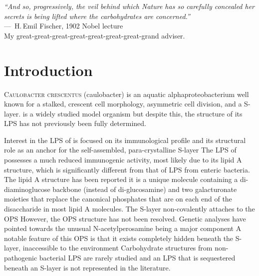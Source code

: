 \acresetall
{}

\begin{epigraph}
  \emph{``And so, progressively, the veil behind which Nature has so carefully concealed her secrets
    is being lifted where the carbohydrates are concerned.''} \\---~H.\,Emil Fischer, 1902 Nobel
  lecture\\ My great-great-great-great-great-great-great-grand adviser.
\end{epigraph}
\section{Introduction} %
\label{sec:lps_introduction} 
\lettrine[lines=2]{C}{aulobacter crescentus} (\acs{caulobacter}) is an aquatic alphaproteobacterium
well known for a stalked, crescent cell morphology, asymmetric cell division, and a
\ac{S-layer}. \caulobacter is a widely studied model organism but despite this, the structure of its \ac{LPS} has not previously been fully
determined.

Interest in the \ac{LPS} of \caulobacter is focused on its immunological
profile and its structural role as an anchor for the
self-assembled, para-crystalline \ac{S-layer} The \ac{LPS}
of \caulobacter possesses a much reduced immunogenic activity, most likely due
to its lipid A structure, which is significantly different from that of
\ac{LPS} from enteric bacteria. The lipid A structure has been
reported it is a unique molecule containing a
di-diaminoglucose backbone (instead of di-glucosamine) and two galacturonate
moieties that replace the canonical phosphates that are on each end of the
disaccharide in most lipid A molecules. The \caulobacter \ac{S-layer}
non-covalently attaches to the \ac{OPS} However, the
\ac{OPS} structure has not been resolved. Genetic analyses have pointed
towards the unusual N-acetylperosamine being a major
component A notable feature of this \ac{OPS} is that it
exists completely hidden beneath the \ac{S-layer}, inaccessible to the
environment Carbohydrate structures from non-pathogenic
bacterial \ac{LPS} are rarely studied and an \ac{LPS} that is sequestered
beneath an \ac{S-layer} is not represented in the literature.
 
